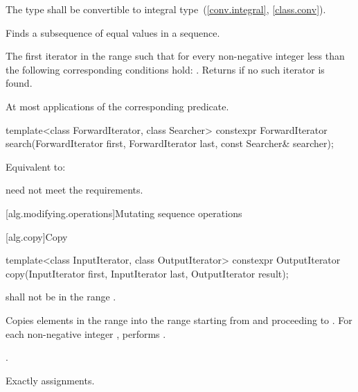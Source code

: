 \begin{itemdescr}
\pnum
\requires
The type
shall be convertible to integral type~(\ref{conv.integral}, \ref{class.conv}).

\pnum
\effects
Finds a subsequence of equal values in a sequence.

\pnum
\returns
The first iterator
in the range 
such that for every non-negative integer
less than
the following corresponding conditions hold:
.
Returns 
if no such iterator is found.

\pnum
\complexity
At most
applications of the corresponding predicate.
\end{itemdescr}

%
\begin{itemdecl}
template<class ForwardIterator, class Searcher>
  constexpr ForwardIterator
    search(ForwardIterator first, ForwardIterator last, const Searcher& searcher);
\end{itemdecl}

\begin{itemdescr}
\pnum
\effects
Equivalent to: 

\pnum
\remarks
{} need not meet the  requirements.
\end{itemdescr}


[alg.modifying.operations]{Mutating sequence operations}

[alg.copy]{Copy}

%
\begin{itemdecl}
template<class InputIterator, class OutputIterator>
  constexpr OutputIterator copy(InputIterator first, InputIterator last,
                                OutputIterator result);
\end{itemdecl}

\begin{itemdescr}
\pnum
\requires {} shall not be in the range .

\pnum
\effects Copies elements in the range  into the range  starting from  and proceeding to . For each non-negative integer , performs .

\pnum
\returns {}.

\pnum
\complexity Exactly  assignments.
\end{itemdescr}

